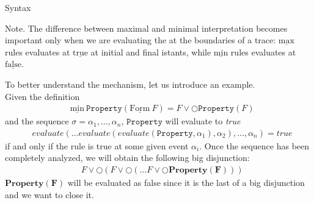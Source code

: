 \documentclass[aspectratio=169,t,xcolor=table]{beamer}
\begin{document}
\begin{frame}[allowframebreaks]{Syntax}
    \begin{block}{Note.}    
        The difference between maximal and minimal interpretation becomes important only when we are evaluating the at the boundaries of a trace: $\underline{\text{max}}$ rules evaluates at $\underline{\text{true}}$ at initial and final istants, while $\underline{\text{min}}$ rules evaluates at $\underline{\text{false}}$.
    \end{block}    
    \newpage
    To better understand the mechanism, let us introduce an example.\\ Given the definition 
    \begin{align*}
        & \underline{\text{min}}\ \mathtt{Property}(\underline{\text{Form}}\ F) =F \lor \bigcirc \mathtt{Property}(F)
    \end{align*} 
    and the sequence $\sigma=\alpha_{1},\ldots ,\alpha_{n}$, $\mathtt{Property}$ will evaluate to \textit{true} 
    \begin{align*}
        & evaluate(\ldots evaluate(evaluate(\mathtt{Property},\alpha_1),\alpha_2),\ldots,\alpha_n)=true
    \end{align*}
    if and only if the rule is true at some given event $\alpha_i$. Once the sequence has been completely analyzed, we will obtain the following big disjunction: 
    \begin{align*}
        & F \lor \bigcirc(F \lor \bigcirc(\ldots F \lor \bigcirc \mathbf{Property(F)})) 
    \end{align*}
    $\mathbf{Property(F)}$ will be evaluated as false since it is the last of a big disjunction and we want to close it.

\end{frame}
\end{document}
